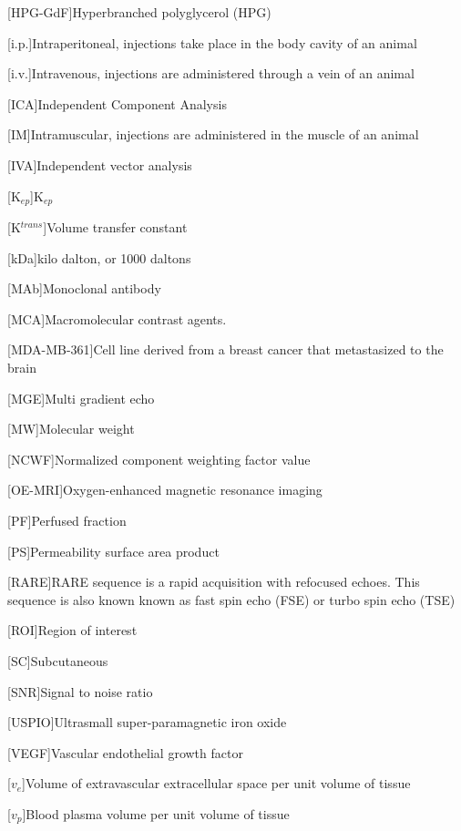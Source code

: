 \begin{acronym}
[HPG-GdF]{Hyperbranched polyglycerol (HPG)}%

[i.p.]{Intraperitoneal, injections take place in the body cavity of an animal}

[i.v.]{Intravenous, injections are administered through a vein of an animal}

[ICA]{Independent Component Analysis}%

[IM]{Intramuscular, injections are administered in the muscle of an animal}

[IVA]{Independent vector analysis}

[K$_{ep}$]{K$_{ep}$}

[K$^{trans}$]{Volume transfer constant}

[kDa]{kilo dalton, or 1000 daltons}

[MAb]{Monoclonal antibody}

[MCA]{Macromolecular contrast agents.}

[MDA-MB-361]{Cell line derived from a breast cancer that metastasized to the brain}

[MGE]{Multi gradient echo}

[MW]{Molecular weight}

[NCWF]{Normalized component weighting factor value}

[OE-MRI]{Oxygen-enhanced magnetic resonance imaging}

[PF]{Perfused fraction}

[PS]{Permeability surface area product}

[RARE]{RARE sequence is a rapid acquisition with refocused echoes. This sequence is also known known as fast spin echo (FSE) or turbo spin echo (TSE)}

[ROI]{Region of interest}

[SC]{Subcutaneous}

[SNR]{Signal to noise ratio}

[USPIO]{Ultrasmall super-paramagnetic iron oxide}

[VEGF]{Vascular endothelial growth factor}

[$v_e$]{Volume of extravascular extracellular space per unit volume of tissue}

[$v_p$]{Blood plasma volume per unit volume of tissue}


\end{acronym}

